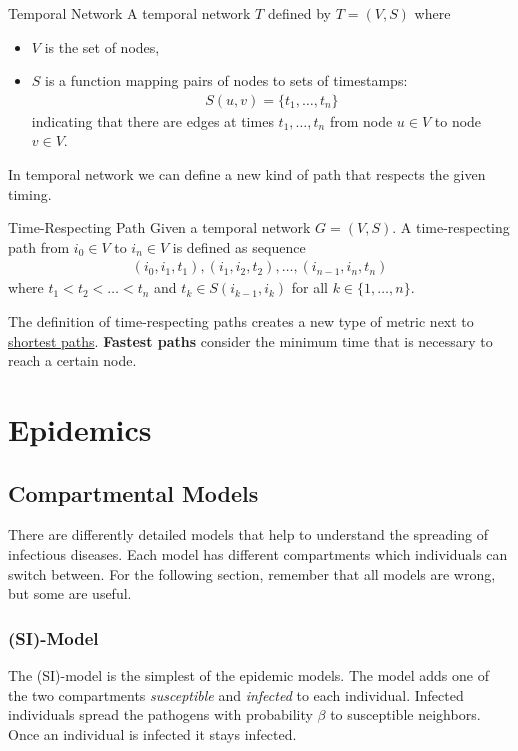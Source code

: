 \documentclass[english]{panikzettel}
\begin{document}
\begin{defi}{Temporal Network}
A temporal network $ T $ defined by $ T = (V,S) $ where
\begin{itemize}
	\item $ V $ is the set of nodes,
	\item $ S $ is a function mapping pairs of nodes to sets of timestamps:
\begin{align*}
	S(u,v) = \{t_1, \dots, t_n\}
\end{align*}
indicating that there are edges at times $ t_1, \dots, t_n $ from node $ u \in V $ to node $ v \in V $.
\end{itemize}
\end{defi}

In temporal network we can define a new kind of path that respects the given timing.

\begin{defi}{Time-Respecting Path}
Given a temporal network $ G = (V,S) $.
A time-respecting path from $ i_0 \in V $ to $ i_n \in V $ is defined as sequence
\begin{align*}
	(i_0,i_1,t_1), (i_1,i_2,t_2), \dots, (i_{n-1}, i_n,t_n)
\end{align*}
where $ t_1 < t_2 < \dots < t_n $ and $ t_k \in S(i_{k-1},i_k) $ for all $ k \in \{1, \dots, n\} $.
\end{defi}

The definition of time-respecting paths creates a new type of metric next to \hyperref[sec:distance]{shortest paths}.
\textbf{Fastest paths} consider the minimum time that is necessary to reach a certain node.

\section{Epidemics}

\subsection{Compartmental Models}
There are differently detailed models that help to understand the spreading of infectious diseases.
Each model has different compartments which individuals can switch between.
For the following section, remember that all models are wrong, but some are useful.

\subsubsection{(SI)-Model}
The (SI)-model is the simplest of the epidemic models.
The model adds one of the two compartments \textit{susceptible} and \textit{infected} to each individual.
Infected individuals spread the pathogens with probability $ \beta $ to susceptible neighbors.
Once an individual is infected it stays infected.
\end{document}
